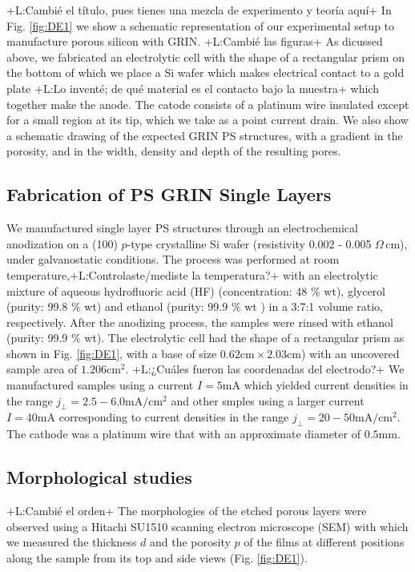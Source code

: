 \documentclass{article}
\newcommand{\notaL}[1]{{\color{blue}+L:#1+}}
\begin{document}
\notaL{Cambié el título, pues tienes una mezcla de experimento y
  teoría aquí}
In Fig. \ref{fig:DE1} we show a schematic representation of our
experimental setup to manufacture porous silicon with GRIN.
\notaL{Cambié las figuras}
As dicussed above, we fabricated an electrolytic cell with the shape of a
rectangular prism on the bottom of which we place a Si wafer which makes
electrical contact to a gold plate \notaL{Lo inventé; de qué material es
  el contacto bajo la muestra} which together make the anode. The
catode consists of a platinum wire insulated except for a small region
at its tip, which we take as a point current drain.
We also show a schematic drawing of the expected GRIN PS structures,
with a gradient in the porosity, and in the width, density and depth
of the resulting pores.

\subsection{Fabrication of PS  GRIN Single Layers}
We manufactured single layer PS structures through an electrochemical
anodization on a (100) $p$-type crystalline Si wafer
(resistivity 0.002 - 0.005 $ \Omega\,\text{cm}$), under galvanostatic
conditions. The process was performed at
room temperature,\notaL{Controlaste/mediste la temperatura?} with an
electrolytic mixture of aqueous hydrofluoric
acid (HF) (concentration: 48 $ \% $ wt), glycerol (purity: 99.8 $ \% $
wt) and ethanol (purity: 99.9 $ \%$ wt ) in a 3:7:1 volume ratio,
respectively. After the anodizing process, the samples were rinsed with
ethanol (purity: 99.9 $ \% $  wt). The electrolytic cell had the shape
of a rectangular prism as shown in Fig. \ref{fig:DE1}, with a base of
size $0.62\text{cm}\times2.03\text{cm}$) with an uncovered sample area
of $1.206\text{cm}^2$. \notaL{¿Cuáles fueron las coordenadas del
  electrodo?} We manufactured samples using a current $I=5\text{mA}$
which yielded current densities in the range
$j_\perp=2.5-6.0\text{mA}/\text{cm}^2$ and other smples using a larger
current $I=40\text{mA}$ corresponding to current densities in the
range $j_\perp=20-50\text{mA}/\text{cm}^2$. The cathode was a
platinum wire that with an approximate diameter of $0.5\text{mm}$.
\subsection{Morphological studies}
\notaL{Cambié el orden}
The morphologies of the etched porous layers were
observed using a Hitachi SU1510 scanning electron microscope (SEM)
with which we measured the thickness $d$ and the porosity $p$ of the
films at different positions along the sample from its top and side
views (Fig. \ref{fig:DE1}).
\end{document}
